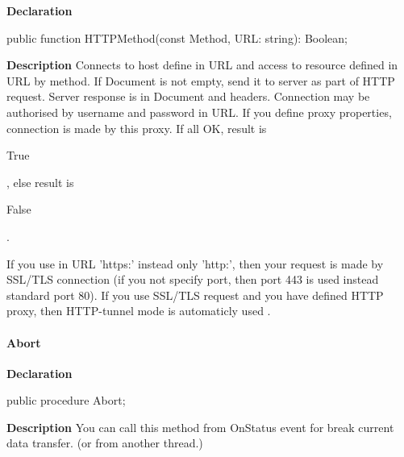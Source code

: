 \documentclass{report}
\newif\ifpdf
\begin{document}
\label{httpsend.THTTPSend-HTTPMethod}
\begin{list}{}{
\setlength{\itemindent}{0cm}
\setlength{\listparindent}{0cm}
\setlength{\leftmargin}{\evensidemargin}
\addtolength{\leftmargin}{\tmplength}
\settowidth{\labelsep}{X}
\addtolength{\leftmargin}{\labelsep}
\setlength{\labelwidth}{\tmplength}
}
\item[\textbf{Declaration}\hfill]
\ifpdf
\begin{flushleft}
\fi
\begin{ttfamily}
public function HTTPMethod(const Method, URL: string): Boolean;\end{ttfamily}

\ifpdf
\end{flushleft}
\fi

\par
\item[\textbf{Description}]
Connects to host define in URL and access to resource defined in URL by method. If Document is not empty, send it to server as part of HTTP request. Server response is in Document and headers. Connection may be authorised by username and password in URL. If you define proxy properties, connection is made by this proxy. If all OK, result is \begin{ttfamily}True\end{ttfamily}, else result is \begin{ttfamily}False\end{ttfamily}.

If you use in URL 'https:' instead only 'http:', then your request is made by SSL/TLS connection (if you not specify port, then port 443 is used instead standard port 80). If you use SSL/TLS request and you have defined HTTP proxy, then HTTP{-}tunnel mode is automaticly used .

\end{list}
\paragraph*{Abort}\hspace*{\fill}

\label{httpsend.THTTPSend-Abort}
\begin{list}{}{
\setlength{\itemindent}{0cm}
\setlength{\listparindent}{0cm}
\setlength{\leftmargin}{\evensidemargin}
\addtolength{\leftmargin}{\tmplength}
\settowidth{\labelsep}{X}
\addtolength{\leftmargin}{\labelsep}
\setlength{\labelwidth}{\tmplength}
}
\item[\textbf{Declaration}\hfill]
\ifpdf
\begin{flushleft}
\fi
\begin{ttfamily}
public procedure Abort;\end{ttfamily}

\ifpdf
\end{flushleft}
\fi

\par
\item[\textbf{Description}]
You can call this method from OnStatus event for break current data transfer. (or from another thread.)

\end{list}
\end{document}
